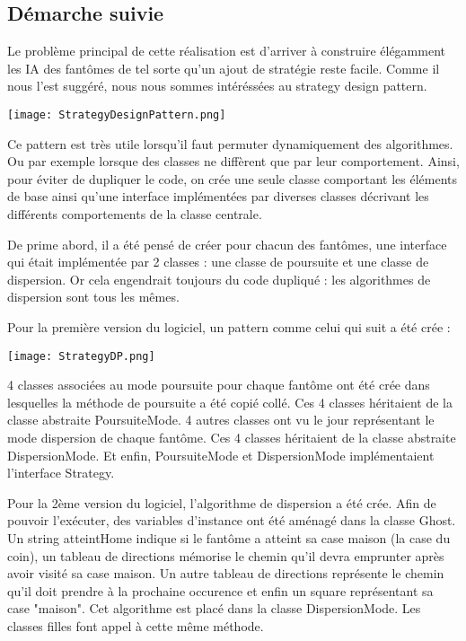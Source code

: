 \documentclass[a4paper,12pt]{report} %
\begin{document}
\subsection{Démarche suivie}

Le problème principal de cette réalisation est d'arriver à construire élégamment les IA des fantômes de tel sorte qu'un ajout de stratégie reste facile.
Comme il nous l'est suggéré, nous nous sommes intéréssées au strategy design pattern.


\texttt{[image: StrategyDesignPattern.png]}


Ce pattern est très utile lorsqu'il faut permuter dynamiquement des algorithmes.
Ou par exemple lorsque des classes ne diffèrent que par leur comportement. Ainsi, pour éviter de dupliquer le code, on crée une seule classe comportant les éléments de base ainsi qu'une interface implémentées par diverses classes décrivant les différents comportements de la classe centrale.

De prime abord, il a été pensé de créer pour chacun des fantômes, une interface qui était implémentée par 2 classes : une classe de poursuite et une classe de dispersion.
Or cela engendrait toujours du code dupliqué : les algorithmes de dispersion sont tous les mêmes.

Pour la première version du logiciel, un pattern comme celui qui suit a été crée :

\texttt{[image: StrategyDP.png]}

4 classes associées au mode poursuite pour chaque fantôme ont été crée dans lesquelles la méthode de poursuite a été copié collé. Ces 4 classes héritaient de la classe abstraite PoursuiteMode.
4 autres classes ont vu le jour représentant le mode dispersion de chaque fantôme.
Ces 4 classes héritaient de la classe abstraite DispersionMode.
Et enfin, PoursuiteMode et DispersionMode implémentaient l'interface Strategy.

Pour la 2ème version du logiciel, l'algorithme de dispersion a été crée.
Afin de pouvoir l'exécuter, des variables d'instance ont été aménagé dans la classe Ghost. Un string atteintHome indique si le fantôme a atteint sa case maison (la case du coin), un tableau de directions mémorise le chemin qu'il devra emprunter après avoir visité sa case maison. Un autre tableau de directions représente le chemin qu'il doit prendre à la prochaine occurence et enfin un square représentant sa case "maison".
Cet algorithme est placé dans la classe DispersionMode. Les classes filles font appel à cette même méthode.
\end{document}
